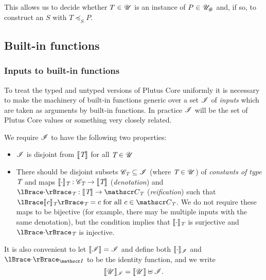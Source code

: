 \noindent This allows us to decide whether $T \in \mathscr{U}$ is an instance of $P \in
{\mathscr{U}_{\#}}$ and, if so, to construct an $S$ with $T \preceq_S P$.


\subsection{Built-in functions}
\label{sec:builtin-functions}

\subsubsection{Inputs to built-in functions}
\label{sec:builtin-inputs}
To treat the typed and untyped versions of Plutus Core uniformly it is necessary
to make the machinery of built-in functions generic over a set $\mathscr{I}$ of
\textit{inputs} which are taken as arguments by built-in functions.  In practice
$\mathscr{I}$ will be the set of Plutus Core values or something very closely
related.%

\medskip
\noindent We require $\mathscr{I}$ to have the following two properties:
\begin{itemize}
\item $\mathscr{I}$ is disjoint from $\llbracket\mathit{\textit{T}}\rrbracket$ for all $\textit{T} \in \mathscr{U}$
\item There should be disjoint subsets $\mathscr{C}_{\textit{T}} \subseteq \mathscr{I}$ (where $\textit{T}
  \in \mathscr{U}$) of \textit{constants of type $\textit{T}$} and maps $\llbracket\mathit{\cdot}\rrbracket_{\textit{T}}:
  \mathscr{C}_{\textit{T}} \rightarrow \llbracket\mathit{\textit{T}}\rrbracket$ (\textit{denotation}) and
  $\reify{\cdot}_{\tn}: \denote{\tn} \rightarrow \Con{\tn}$
  (\textit{reification}) such that $\reify{\denote{c}_{\tn}}_{\tn} = c \text{
    for all } c \in \Con{\tn}$.  We do not require these maps to be bijective
  (for example, there may be multiple inputs with the same denotation), but the
  condition implies that $\llbracket\mathit{\cdot}\rrbracket_{\textit{T}}$ is surjective and
  $\reify{\cdot}_{\tn}$ is injective.
\end{itemize}%
%
%

\noindent It is also convenient to let $\llbracket\mathit{\mathscr{I}}\rrbracket = \mathscr{I}$ and define both
  $\llbracket\mathit{\cdot}\rrbracket_{\mathscr{I}}$ and $\reify{\cdot}_{\Inputs}$ to be the identity
function, and we write
$$
\llbracket\mathit{\mathscr{U}}\rrbracket_{\mathscr{I}} = \llbracket\mathit{\mathscr{U}}\rrbracket \uplus \mathscr{I}.
$$

